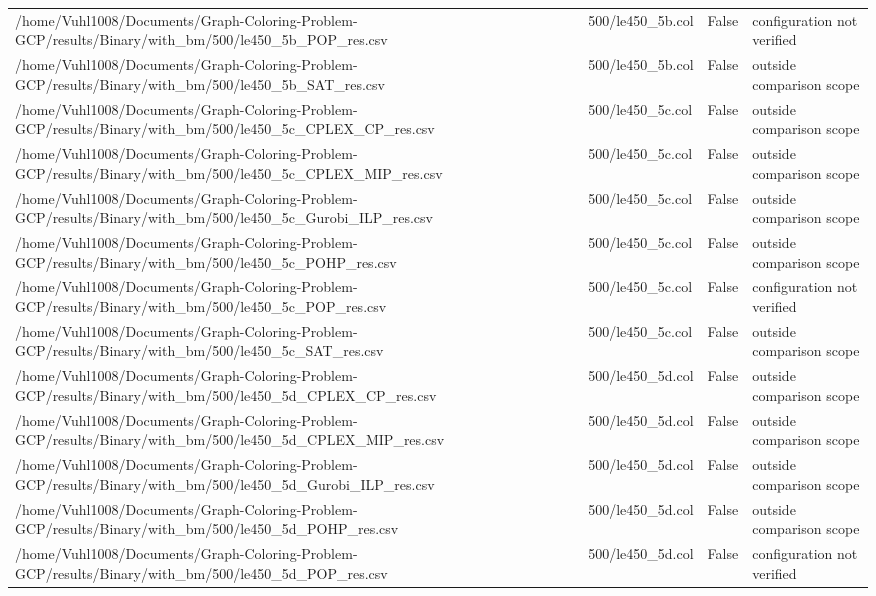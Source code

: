 \begin{table}[htbp]
\begin{tabular}{llll}
/home/Vuhl1008/Documents/Graph-Coloring-Problem-GCP/results/Binary/with\_bm/500/le450\_5b\_POP\_res.csv & 500/le450\_5b.col & False & configuration not verified \\
/home/Vuhl1008/Documents/Graph-Coloring-Problem-GCP/results/Binary/with\_bm/500/le450\_5b\_SAT\_res.csv & 500/le450\_5b.col & False & outside comparison scope \\
/home/Vuhl1008/Documents/Graph-Coloring-Problem-GCP/results/Binary/with\_bm/500/le450\_5c\_CPLEX\_CP\_res.csv & 500/le450\_5c.col & False & outside comparison scope \\
/home/Vuhl1008/Documents/Graph-Coloring-Problem-GCP/results/Binary/with\_bm/500/le450\_5c\_CPLEX\_MIP\_res.csv & 500/le450\_5c.col & False & outside comparison scope \\
/home/Vuhl1008/Documents/Graph-Coloring-Problem-GCP/results/Binary/with\_bm/500/le450\_5c\_Gurobi\_ILP\_res.csv & 500/le450\_5c.col & False & outside comparison scope \\
/home/Vuhl1008/Documents/Graph-Coloring-Problem-GCP/results/Binary/with\_bm/500/le450\_5c\_POHP\_res.csv & 500/le450\_5c.col & False & outside comparison scope \\
/home/Vuhl1008/Documents/Graph-Coloring-Problem-GCP/results/Binary/with\_bm/500/le450\_5c\_POP\_res.csv & 500/le450\_5c.col & False & configuration not verified \\
/home/Vuhl1008/Documents/Graph-Coloring-Problem-GCP/results/Binary/with\_bm/500/le450\_5c\_SAT\_res.csv & 500/le450\_5c.col & False & outside comparison scope \\
/home/Vuhl1008/Documents/Graph-Coloring-Problem-GCP/results/Binary/with\_bm/500/le450\_5d\_CPLEX\_CP\_res.csv & 500/le450\_5d.col & False & outside comparison scope \\
/home/Vuhl1008/Documents/Graph-Coloring-Problem-GCP/results/Binary/with\_bm/500/le450\_5d\_CPLEX\_MIP\_res.csv & 500/le450\_5d.col & False & outside comparison scope \\
/home/Vuhl1008/Documents/Graph-Coloring-Problem-GCP/results/Binary/with\_bm/500/le450\_5d\_Gurobi\_ILP\_res.csv & 500/le450\_5d.col & False & outside comparison scope \\
/home/Vuhl1008/Documents/Graph-Coloring-Problem-GCP/results/Binary/with\_bm/500/le450\_5d\_POHP\_res.csv & 500/le450\_5d.col & False & outside comparison scope \\
/home/Vuhl1008/Documents/Graph-Coloring-Problem-GCP/results/Binary/with\_bm/500/le450\_5d\_POP\_res.csv & 500/le450\_5d.col & False & configuration not verified \\

\end{tabular}
\end{table}
